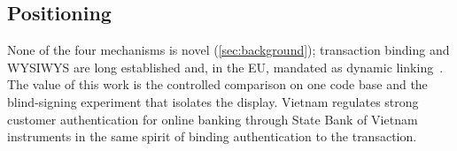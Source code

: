 \subsection{Positioning}
None of the four mechanisms is novel (\cref{sec:background}); transaction binding
and WYSIWYS are long established and, in the EU, mandated as dynamic
linking~\cite{eu2018389}. The value of this work is the controlled comparison on
one code base and the blind-signing experiment that isolates the display.
Vietnam regulates strong customer authentication for online banking through
State Bank of Vietnam instruments in the same spirit of binding authentication to
the transaction.
